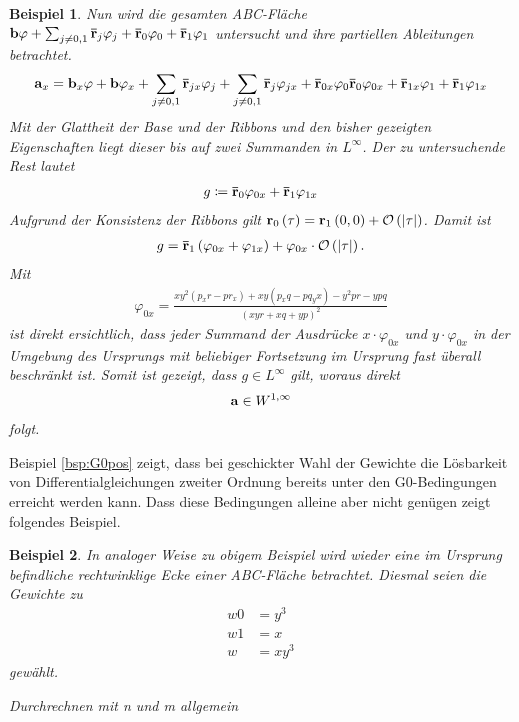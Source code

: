 \documentclass[10pt,a4paper,oneside]{report}
\newtheorem{beispiel}{Beispiel}[chapter]
\begin{document}
\begin{beispiel}
Nun wird die gesamten ABC-Fläche $\bold{b} \varphi + \sum_{j\neq 0,1} \bold{\bar{r}}_j \varphi_j + \bold{\bar{r}}_0 \varphi_0 + \bold{\bar{r}}_1 \varphi_1$ untersucht und ihre partiellen Ableitungen betrachtet.
\begin{align*}
\bold{a}_x = \bold{b}_x \varphi + \bold{b} \varphi_x + \sum_{j\neq 0,1} \bold{\bar{r}}_{jx} \varphi_j + \sum_{j\neq 0,1} \bold{\bar{r}}_j \varphi_{jx} + \bold{\bar{r}}_{0x} \varphi_0 \bold{\bar{r}}_{0} \varphi_{0x}+ \bold{\bar{r}}_{1x} \varphi_1 + \bold{\bar{r}}_{1} \varphi_{1x} 
\end{align*}
Mit der Glattheit der Base und der Ribbons und den bisher gezeigten Eigenschaften liegt dieser bis auf zwei Summanden in $L^{\infty}$.
Der zu untersuchende Rest lautet
\begin{align*}
g \coloneqq \bold{\bar{r}}_{0} \varphi_{0x} + \bold{\bar{r}}_{1} \varphi_{1x}
\end{align*}
Aufgrund der Konsistenz der Ribbons gilt $\bold{r}_0 \left(\tau\right) = \bold{r}_1 \left(0,0\right) + \mathcal{O} \left( \left| \tau \right| \right)$.
Damit ist
\begin{align*}
g = \bold{\bar{r}}_{1} \left( \varphi_{0x} + \varphi_{1x} \right) + \varphi_{0x} \cdot \mathcal{O} \left( \left| \tau \right| \right).
\end{align*}
Mit  
\begin{align*}
\varphi_{0x} = \frac{x y^2 \left( p_xr- p r_x\right) + xy \left(p_x q -p q_yx\right) - y^2 pr - ypq}{\left(xy r + x q+ y p \right)^2}
\end{align*}
ist direkt ersichtlich, dass jeder Summand der Ausdrücke $x \cdot \varphi_{0x}$ und $y \cdot \varphi_{0x}$ in der Umgebung des Ursprungs mit beliebiger Fortsetzung im Ursprung fast überall beschränkt ist. 
Somit ist gezeigt, dass $g \in L^{\infty}$ gilt, woraus direkt
\begin{align*}
\bold{a} \in W^{1,\infty}
\end{align*}
folgt.
\end{beispiel}

Beispiel \ref{bsp:G0pos} zeigt, dass bei geschickter Wahl der Gewichte die Lösbarkeit von Differentialgleichungen zweiter Ordnung bereits unter den G0-Bedingungen erreicht werden kann.
Dass diese Bedingungen alleine aber nicht genügen zeigt folgendes Beispiel.

\begin{beispiel}
In analoger Weise zu obigem Beispiel wird wieder eine im Ursprung befindliche rechtwinklige Ecke einer ABC-Fläche betrachtet.
Diesmal seien die Gewichte zu
\begin{align*}
w0 &= y^3 \\
w1 &= x \\
w &= xy^3
\end{align*}
gewählt.

Durchrechnen
mit n und m allgemein
\end{beispiel}
\end{document}
